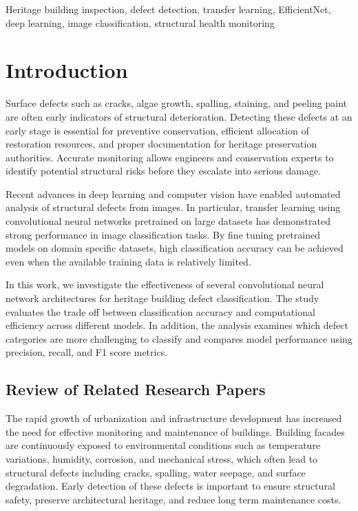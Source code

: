 \documentclass[conference]{IEEEtran}
\begin{document}
\begin{IEEEkeywords}
Heritage building inspection, defect detection, transfer learning, EfficientNet, deep learning, image classification, structural health monitoring
\end{IEEEkeywords}

\section{Introduction}
Surface defects such as cracks, algae growth, spalling, staining, and peeling paint are often early indicators of structural deterioration. Detecting these defects at an early stage is essential for preventive conservation, efficient allocation of restoration resources, and proper documentation for heritage preservation authorities. Accurate monitoring allows engineers and conservation experts to identify potential structural risks before they escalate into serious damage.

Recent advances in deep learning and computer vision have enabled automated analysis of structural defects from images. In particular, transfer learning using convolutional neural networks pretrained on large datasets has demonstrated strong performance in image classification tasks. By fine tuning pretrained models on domain specific datasets, high classification accuracy can be achieved even when the available training data is relatively limited.

In this work, we investigate the effectiveness of several convolutional neural network architectures for heritage building defect classification. The study evaluates the trade off between classification accuracy and computational efficiency across different models. In addition, the analysis examines which defect categories are more challenging to classify and compares model performance using precision, recall, and F1 score metrics. 

\subsection{Review of Related Research Papers}

The rapid growth of urbanization and infrastructure development has increased the need for effective monitoring and maintenance of buildings. Building facades are continuously exposed to environmental conditions such as temperature variations, humidity, corrosion, and mechanical stress, which often lead to structural defects including cracks, spalling, water seepage, and surface degradation. Early detection of these defects is important to ensure structural safety, preserve architectural heritage, and reduce long term maintenance costs.
\end{document}

